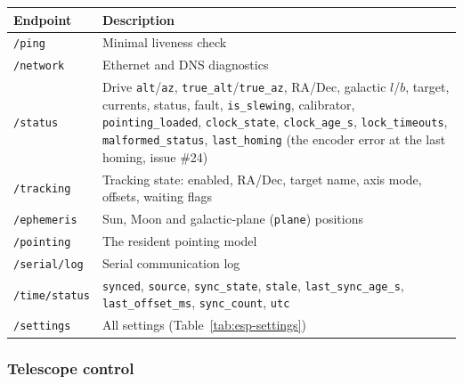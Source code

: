 \documentclass[11pt,a4paper]{article}
\begin{document}
\footnotesize
\begin{longtable}{lp{9.6cm}}
\toprule
\textbf{Endpoint} & \textbf{Description} \\
\midrule
\endhead
\texttt{/ping} & Minimal liveness check \\
\texttt{/network} & Ethernet and DNS diagnostics \\
\texttt{/status} & Drive \texttt{alt}/\texttt{az}, \texttt{true\_alt}/\texttt{true\_az}, RA/Dec, galactic $l$/$b$, target, currents, status, fault, \texttt{is\_slewing}, calibrator, \texttt{pointing\_loaded}, \texttt{clock\_state}, \texttt{clock\_age\_s}, \texttt{lock\_timeouts}, \texttt{malformed\_status}, \texttt{last\_homing} (the encoder error at the last homing, issue \#24) \\
\texttt{/tracking} & Tracking state: enabled, RA/Dec, target name, axis mode, offsets, waiting flags \\
\texttt{/ephemeris} & Sun, Moon and galactic-plane (\texttt{plane}) positions \\
\texttt{/pointing} & The resident pointing model \\
\texttt{/serial/log} & Serial communication log \\
\texttt{/time/status} & \texttt{synced}, \texttt{source}, \texttt{sync\_state}, \texttt{stale}, \texttt{last\_sync\_age\_s}, \texttt{last\_offset\_ms}, \texttt{sync\_count}, \texttt{utc} \\
\texttt{/settings} & All settings (Table~\ref{tab:esp-settings}) \\
\bottomrule
\end{longtable}

\subsubsection{Telescope control}
\end{document}

